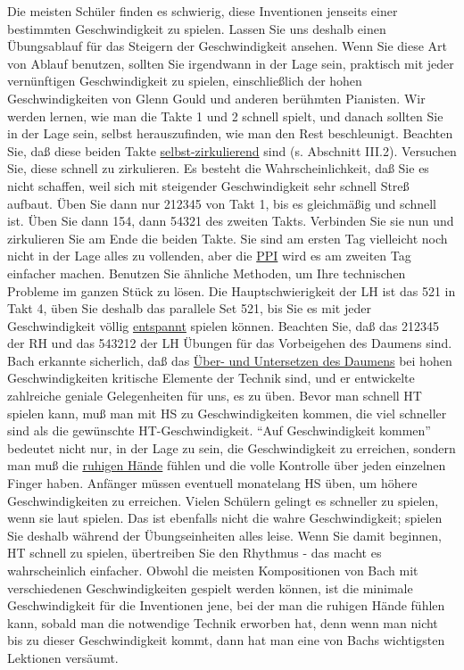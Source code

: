 Die meisten Schüler finden es schwierig, diese Inventionen jenseits einer bestimmten Geschwindigkeit zu spielen.
Lassen Sie uns deshalb einen Übungsablauf für das Steigern der Geschwindigkeit ansehen.
Wenn Sie diese Art von Ablauf benutzen, sollten Sie irgendwann in der Lage sein, praktisch mit jeder vernünftigen Geschwindigkeit zu spielen, einschließlich der hohen Geschwindigkeiten von Glenn Gould und anderen berühmten Pianisten.
Wir werden lernen, wie man die Takte 1 und 2 schnell spielt, und danach sollten Sie in der Lage sein, selbst herauszufinden, wie man den Rest beschleunigt.
Beachten Sie, daß diese beiden Takte \hyperlink{c1iii2}{selbst-zirkulierend} sind (s. Abschnitt III.2).
Versuchen Sie, diese schnell zu zirkulieren.
Es besteht die Wahrscheinlichkeit, daß Sie es nicht schaffen, weil sich mit steigender Geschwindigkeit sehr schnell Streß aufbaut.
Üben Sie dann nur 212345 von Takt 1, bis es gleichmäßig und schnell ist.
Üben Sie dann 154, dann 54321 des zweiten Takts.
Verbinden Sie sie nun und zirkulieren Sie am Ende die beiden Takte.
Sie sind am ersten Tag vielleicht noch nicht in der Lage alles zu vollenden, aber die \hyperlink{c1ii15}{PPI} wird es am zweiten Tag einfacher machen.
Benutzen Sie ähnliche Methoden, um Ihre technischen Probleme im ganzen Stück zu lösen.
Die Hauptschwierigkeit der LH ist das 521 in Takt 4, üben Sie deshalb das parallele Set 521, bis Sie es mit jeder Geschwindigkeit völlig \hyperlink{c1ii14}{entspannt} spielen können.
Beachten Sie, daß das 212345 der RH und das 543212 der LH Übungen für das Vorbeigehen des Daumens sind.
Bach erkannte sicherlich, daß das \hyperlink{c1iii5a}{Über- und Untersetzen des Daumens} bei hohen Geschwindigkeiten kritische Elemente der Technik sind, und er entwickelte zahlreiche geniale Gelegenheiten für uns, es zu üben.
Bevor man schnell HT spielen kann, muß man mit HS zu Geschwindigkeiten kommen, die viel schneller sind als die gewünschte HT-Geschwindigkeit.
\enquote{Auf Geschwindigkeit kommen} bedeutet nicht nur, in der Lage zu sein, die Geschwindigkeit zu erreichen, sondern man muß die \hyperlink{ruhig}{ruhigen Hände} fühlen und die volle Kontrolle über jeden einzelnen Finger haben.
Anfänger müssen eventuell monatelang HS üben, um höhere Geschwindigkeiten zu erreichen.
Vielen Schülern gelingt es schneller zu spielen, wenn sie laut spielen.
Das ist ebenfalls nicht die wahre Geschwindigkeit; spielen Sie deshalb während der Übungseinheiten alles leise.
Wenn Sie damit beginnen, HT schnell zu spielen, übertreiben Sie den Rhythmus - das macht es wahrscheinlich einfacher.
Obwohl die meisten Kompositionen von Bach mit verschiedenen Geschwindigkeiten gespielt werden können, ist die minimale Geschwindigkeit für die Inventionen jene, bei der man die ruhigen Hände fühlen kann, sobald man die notwendige Technik erworben hat, denn wenn man nicht bis zu dieser Geschwindigkeit kommt, dann hat man eine von Bachs wichtigsten Lektionen versäumt.

